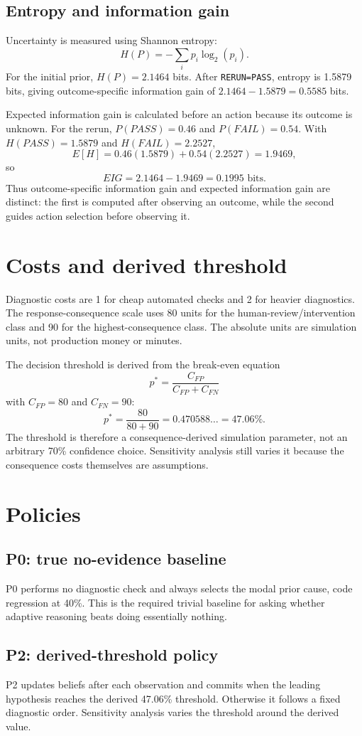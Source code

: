 \documentclass[11pt]{article}
\begin{document}
\subsection{Entropy and information gain}
Uncertainty is measured using Shannon entropy:
\[
H(P)=-\sum_i p_i\log_2(p_i).
\]
For the initial prior, $H(P)=2.1464$ bits. After \texttt{RERUN=PASS}, entropy is 1.5879 bits, giving outcome-specific information gain of $2.1464-1.5879=0.5585$ bits.

Expected information gain is calculated before an action because its outcome is unknown. For the rerun, $P(PASS)=0.46$ and $P(FAIL)=0.54$. With $H(PASS)=1.5879$ and $H(FAIL)=2.2527$,
\[
E[H]=0.46(1.5879)+0.54(2.2527)=1.9469,
\]
so
\[
EIG=2.1464-1.9469=0.1995\text{ bits}.
\]
Thus outcome-specific information gain and expected information gain are distinct: the first is computed after observing an outcome, while the second guides action selection before observing it.

\section{Costs and derived threshold}
Diagnostic costs are 1 for cheap automated checks and 2 for heavier diagnostics. The response-consequence scale uses 80 units for the human-review/intervention class and 90 for the highest-consequence class. The absolute units are simulation units, not production money or minutes.

The decision threshold is derived from the break-even equation
\[
p^* = \frac{C_{FP}}{C_{FP}+C_{FN}}
\]
with $C_{FP}=80$ and $C_{FN}=90$:
\[
p^* = \frac{80}{80+90}=0.470588\ldots=47.06\%.
\]
The threshold is therefore a consequence-derived simulation parameter, not an arbitrary 70\% confidence choice. Sensitivity analysis still varies it because the consequence costs themselves are assumptions.

\section{Policies}
\subsection{P0: true no-evidence baseline}
P0 performs no diagnostic check and always selects the modal prior cause, code regression at 40\%. This is the required trivial baseline for asking whether adaptive reasoning beats doing essentially nothing.

\subsection{P2: derived-threshold policy}
P2 updates beliefs after each observation and commits when the leading hypothesis reaches the derived 47.06\% threshold. Otherwise it follows a fixed diagnostic order. Sensitivity analysis varies the threshold around the derived value.
\end{document}

